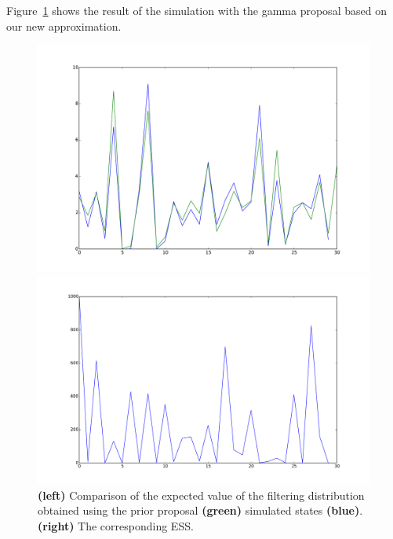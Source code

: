 \documentclass{article}
\begin{document}
 \clearpage
Figure~\ref{fig:gamma2} shows the result of the simulation with the gamma proposal based on our new approximation.

\begin{figure}[htb]
	\centering
	\begin{minipage}{.45\textwidth}
		\centering
		\includegraphics[width=0.97\linewidth]{bootstrap-filter/diagno_gamma2.pdf}
	\end{minipage}
	\begin{minipage}{.45\textwidth}
		\centering
		\includegraphics[width=0.97\linewidth]{bootstrap-filter/ESS_gamma2.pdf}
	\end{minipage}
	\caption{\textbf{(left)} Comparison of the expected value of the filtering distribution obtained using the prior proposal \textbf{(green)} simulated states \textbf{(blue)}. \textbf{(right)} The corresponding ESS. }
	\label{fig:gamma2}
\end{figure}
\end{document}
